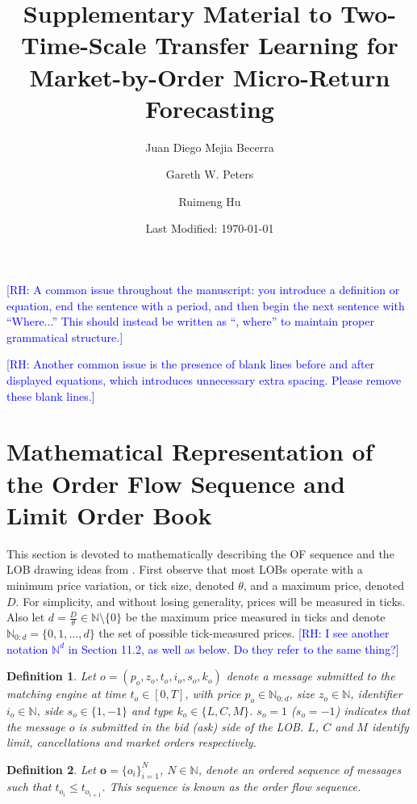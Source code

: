 \documentclass[10pt,a4paper,oneside]{article}
\title{Supplementary Material to Two-Time-Scale Transfer Learning for Market-by-Order Micro-Return Forecasting}
\author[1]{Juan Diego Mejia Becerra}
\author[1]{Gareth W. Peters}
\author[1,2]{Ruimeng Hu}
\affil[1]{Department of Statistics and Applied Probability, University of California, Santa Barbara}
\affil[2]{Department of Mathematics, University of California, Santa Barbara}
\date{Last Modified: \today}
\newcommand{\N}{\mathbb{N}}
\newcommand{\rh}[1]{\textcolor{blue}{\textsf{[RH: #1]}}}
\newtheorem{definition}{Definition}
\begin{document}
\maketitle

\tableofcontents
\clearpage


\appendix


\rh{A common issue throughout the manuscript: you introduce a definition or equation, end the sentence with a period, and then begin the next sentence with “Where...” This should instead be written as “, where” to maintain proper grammatical structure.}

\rh{Another common issue is the presence of blank lines before and after displayed equations, which introduces unnecessary extra spacing. Please remove these blank lines.}
\section{Mathematical Representation of the Order Flow Sequence and Limit Order Book}
\label{ap:matreplob}


This section is devoted to mathematically describing the OF sequence and the LOB drawing ideas from \cite{cont2023mathematical, gould2013limit, panayi2015stochastic}. First observe that most LOBs operate with a minimum price variation, or tick size, denoted $\theta$, and a maximum price, denoted $D$. For simplicity, and without losing generality, prices will be measured in ticks. Also let $d = \frac{D}{\theta} \in \N \setminus \{ 0 \}$ be the maximum price measured in ticks and denote $\N_{0:d} = \{ 0, 1, \dots, d\}$ the set of possible tick-measured prices. \rh{I see another notation $\N^d$ in Section 11.2, as well as below. Do they refer to the same thing?}
 
\begin{definition}
    Let $o = (p_o, z_o, t_o, i_o, s_o, k_o)$ denote a message submitted to the matching engine at time $t_o \in [0, T]$, with price $p_o \in \N_{0:d}$, size $z_o \in \N$, identifier $i_o \in \N$, side $s_o \in \{1, -1\}$ and type $k_o \in \{L, C, M \}$. $s_o = 1$ ($s_o = -1$) indicates that the message $o$ is submitted in the bid (ask) side of the LOB. $L$, $C$ and $M$ identify limit, cancellations and market orders respectively. 
    \label{def:order}
\end{definition}

\begin{definition}
    Let $\mathbf{o} = \{o_i\}^N_{i = 1} $, $N \in \N$, denote an ordered sequence of messages such that $t_{o_i} \leq t_{o_{i + 1}}$. This sequence is known as the order flow sequence.
\label{def:order_seq}
\end{definition}
\end{document}
